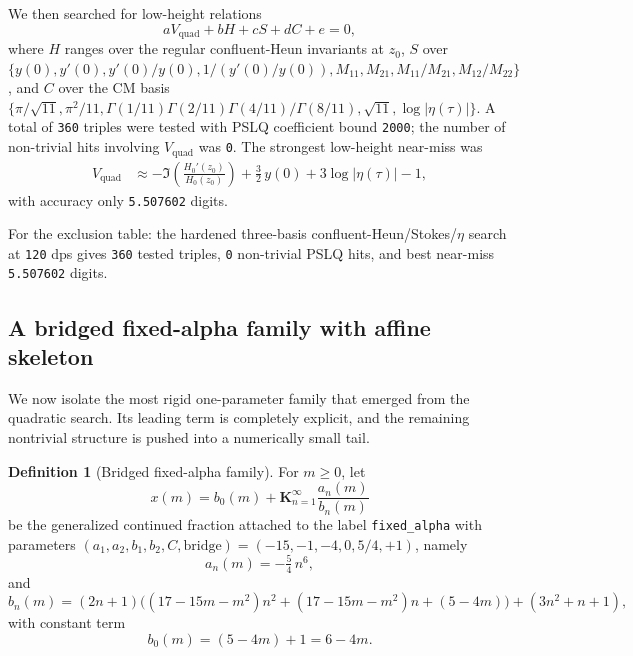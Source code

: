 \documentclass[11pt,a4paper]{article}
\theoremstyle{definition}
\newtheorem{definition}[theorem]{Definition}
\theoremstyle{remark}
\begin{document}
We then searched for low-height relations
\[
  aV_{\mathrm{quad}} + bH + cS + dC + e = 0,
\]
where $H$ ranges over the regular confluent-Heun invariants at $z_0$, $S$ over
$\{y(0),y'(0),y'(0)/y(0),1/(y'(0)/y(0)),M_{11},M_{21},M_{11}/M_{21},M_{12}/M_{22}\}$,
and $C$ over the CM basis
$\{\pi/\sqrt{11},\pi^2/11,\Gamma(1/11)\Gamma(2/11)\Gamma(4/11)/\Gamma(8/11),\sqrt{11},\log|\eta(\tau)|\}$.
A total of \texttt{360} triples were tested with PSLQ coefficient bound
\texttt{2000}; the number of non-trivial hits involving $V_{\mathrm{quad}}$ was
\texttt{0}.  The strongest low-height near-miss was
\begin{align}
V_{\mathrm{quad}}
  &\approx -\Im\!\left(\frac{H_0'(z_0)}{H_0(z_0)}\right)
   + \frac{3}{2}\,y(0)
   + 3\log|\eta(\tau)| - 1,
\end{align}
with accuracy only \texttt{5.507602} digits.

For the exclusion table: the hardened three-basis confluent-Heun/Stokes/$\eta$
search at \texttt{120} dps gives \texttt{360} tested triples, \texttt{0}
non-trivial PSLQ hits, and best near-miss \texttt{5.507602} digits.

\subsection{A bridged fixed-alpha family with affine skeleton}\label{subsec:affine-skeleton}

We now isolate the most rigid one-parameter family that emerged from the
quadratic search. Its leading term is completely explicit, and the remaining
nontrivial structure is pushed into a numerically small tail.

\begin{definition}[Bridged fixed-alpha family]\label{def:bridged-fixed-alpha}
For $m \ge 0$, let
\[
  x(m) = b_0(m) + \mathbf{K}_{n=1}^{\infty} \frac{a_n(m)}{b_n(m)}
\]
be the generalized continued fraction attached to the label
\texttt{fixed\_alpha} with parameters
$(a_1,a_2,b_1,b_2,C,\mathrm{bridge}) = (-15,-1,-4,0,5/4,+1)$, namely
\begin{equation}\label{eq:fixed-alpha-an}
  a_n(m) = -\tfrac{5}{4}\,n^6,
\end{equation}
and
\begin{equation}\label{eq:fixed-alpha-bn}
  b_n(m) = (2n+1)\bigl((17-15m-m^2)n^2 + (17-15m-m^2)n + (5-4m)\bigr)
  + (3n^2+n+1),
\end{equation}
with constant term
\begin{equation}\label{eq:fixed-alpha-b0}
  b_0(m) = (5-4m)+1 = 6-4m.
\end{equation}
\end{definition}
\end{document}
